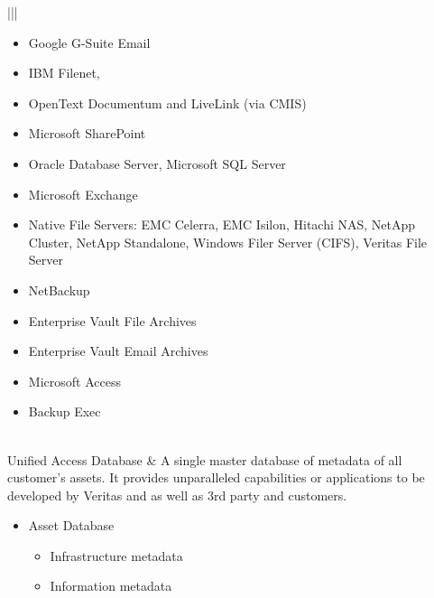 \documentclass[letterpaper,10pt,english]{sphinxhowto}
\begin{document}
\begin{savenotes}
\begin{longtable}{|||}
\begin{itemize}
\item {} 
Google G-Suite Email

\end{itemize}

\begin{itemize}
\item {} 
IBM Filenet,

\item {} 
OpenText Documentum and LiveLink (via CMIS)

\item {} 
Microsoft SharePoint

\item {} 
Oracle Database Server, Microsoft SQL Server

\item {} 
Microsoft Exchange

\item {} 
Native File Servers: EMC Celerra, EMC Isilon, Hitachi NAS, NetApp Cluster,
NetApp Standalone, Windows Filer Server (CIFS), Veritas File Server

\end{itemize}

\begin{itemize}
\item {} 
NetBackup

\item {} 
Enterprise Vault File Archives

\item {} 
Enterprise Vault Email Archives

\item {} 
Microsoft Access

\item {} 
Backup Exec

\end{itemize}
\\
\hline
Unified Access Database
&
A single master database of metadata of all customer’s assets. It provides unparalleled
capabilities or applications to be developed by Veritas and as well as 3rd party and
customers.
\begin{itemize}
\item {} 
Asset Database
\begin{itemize}
\item {} 
Infrastructure metadata

\item {} 
Information metadata


\end{itemize}
\end{itemize}
\end{longtable}
\end{savenotes}
\end{document}
